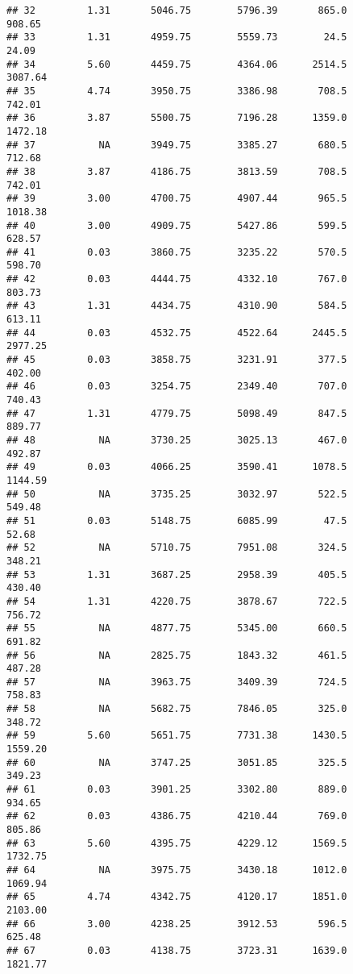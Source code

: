\documentclass[]{article}
\begin{document}
\begin{verbatim}
## 32         1.31       5046.75        5796.39       865.0       908.65
## 33         1.31       4959.75        5559.73        24.5        24.09
## 34         5.60       4459.75        4364.06      2514.5      3087.64
## 35         4.74       3950.75        3386.98       708.5       742.01
## 36         3.87       5500.75        7196.28      1359.0      1472.18
## 37           NA       3949.75        3385.27       680.5       712.68
## 38         3.87       4186.75        3813.59       708.5       742.01
## 39         3.00       4700.75        4907.44       965.5      1018.38
## 40         3.00       4909.75        5427.86       599.5       628.57
## 41         0.03       3860.75        3235.22       570.5       598.70
## 42         0.03       4444.75        4332.10       767.0       803.73
## 43         1.31       4434.75        4310.90       584.5       613.11
## 44         0.03       4532.75        4522.64      2445.5      2977.25
## 45         0.03       3858.75        3231.91       377.5       402.00
## 46         0.03       3254.75        2349.40       707.0       740.43
## 47         1.31       4779.75        5098.49       847.5       889.77
## 48           NA       3730.25        3025.13       467.0       492.87
## 49         0.03       4066.25        3590.41      1078.5      1144.59
## 50           NA       3735.25        3032.97       522.5       549.48
## 51         0.03       5148.75        6085.99        47.5        52.68
## 52           NA       5710.75        7951.08       324.5       348.21
## 53         1.31       3687.25        2958.39       405.5       430.40
## 54         1.31       4220.75        3878.67       722.5       756.72
## 55           NA       4877.75        5345.00       660.5       691.82
## 56           NA       2825.75        1843.32       461.5       487.28
## 57           NA       3963.75        3409.39       724.5       758.83
## 58           NA       5682.75        7846.05       325.0       348.72
## 59         5.60       5651.75        7731.38      1430.5      1559.20
## 60           NA       3747.25        3051.85       325.5       349.23
## 61         0.03       3901.25        3302.80       889.0       934.65
## 62         0.03       4386.75        4210.44       769.0       805.86
## 63         5.60       4395.75        4229.12      1569.5      1732.75
## 64           NA       3975.75        3430.18      1012.0      1069.94
## 65         4.74       4342.75        4120.17      1851.0      2103.00
## 66         3.00       4238.25        3912.53       596.5       625.48
## 67         0.03       4138.75        3723.31      1639.0      1821.77

\end{verbatim}
\end{document}
